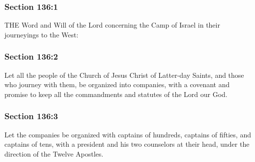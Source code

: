 	\subsubsection{Section 136:1} %
		\label{DC136-1}

		THE Word and Will of the Lord concerning the Camp of Israel in their journeyings to the West:


	\subsubsection{Section 136:2} %
		\label{DC136-2}

		Let all the people of the Church of Jesus Christ of Latter-day Saints, and those who journey with them, be organized into companies, with a covenant and promise to keep all the commandments and statutes of the Lord our God.


	\subsubsection{Section 136:3} %
		\label{DC136-3}

		Let the companies be organized with captains of hundreds, captains of fifties, and captains of tens, with a president and his two counselors at their head, under the direction of the Twelve Apostles.


